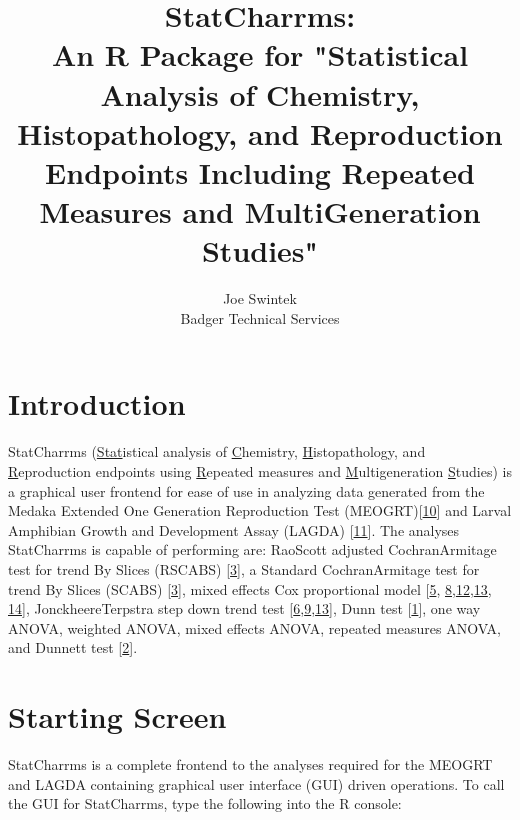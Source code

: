 \documentclass[a4paper]{article}
\begin{document}
\title{StatCharrms:\\ An R Package for "Statistical Analysis of Chemistry, Histopathology, and Reproduction Endpoints Including Repeated Measures and Multi\textendash{}Generation Studies"}
\author{Joe Swintek \\ Badger Technical Services }



\maketitle
\clearpage
\tableofcontents
\clearpage


\section*{Introduction}
\label{sec:intro}
\thispagestyle{plain}


	
StatCharrms (\underline{Stat}istical analysis of \underline{C}hemistry, \underline{H}istopathology, and 
\underline{R}eproduction
endpoints using \underline{R}epeated measures and 
\underline{M}ulti\textendash{}generation \underline{S}tudies) is a graphical user front\textendash{}end for ease of use in analyzing data 
generated from the Medaka 
Extended One Generation Reproduction Test (MEOGRT)[\hyperlink{R10}{10}] and Larval Amphibian Growth and Development Assay (LAGDA) [\hyperlink{R11}{11}].  
The analyses StatCharrms is capable of performing are: Rao\textendash{}Scott adjusted Cochran\textendash{}Armitage 
test for trend By Slices (RSCABS) [\hyperlink{R3}{3}], 
a Standard Cochran\textendash{}Armitage test for trend By Slices (SCABS) [\hyperlink{R3}{3}], mixed effects Cox proportional model [\hyperlink{R5}{5},
\hyperlink{R8}{8},\hyperlink{R12}{12},\hyperlink{R13}{13}, \hyperlink{R14}{14}], 
Jonckheere\textendash{}Terpstra step down trend test 
[\hyperlink{R6}{6},\hyperlink{R9}{9},\hyperlink{R13}{13}], Dunn test [\hyperlink{R1}{1}], one way ANOVA, weighted ANOVA, 
mixed effects ANOVA, repeated measures ANOVA, and 
Dunnett test [\hyperlink{R2}{2}]. 



\section*{Starting Screen}
\label{sec:StartingScreen}
\thispagestyle{plain}


	StatCharrms is a complete front\textendash{}end to the analyses required for the MEOGRT and LAGDA 
	containing graphical user interface (GUI) driven operations. To call the GUI for StatCharrms,  
	type the following into the R console:       
\end{document}
